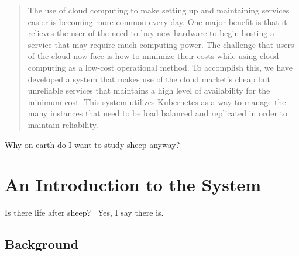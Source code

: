 \documentclass[thesis,proposal]{umassthesis}  %
\begin{document}
\begin{abstract}                %
  The use of cloud computing to make setting up and maintaining services easier
  is becoming more common every day. One major benefit is that it relieves the
  user of the need to buy new hardware to begin hosting a service that may require
  much computing power. The challenge that users of the cloud now face is how to
  minimize their costs while using cloud computing as a low-cost operational method.
  To accomplish this, we have developed a system that makes use of the cloud market's
  cheap but unreliable services that maintains a high level of availability for the
  minimum cost. This system utilizes Kubernetes as a way to manage the many instances
  that need to be load balanced and replicated in order to maintain reliability.
\end{abstract}



\tableofcontents                %
\listoftables                   %
\listoffigures                  %


\mainmatter   %

Why on earth do I want to study sheep anyway?

\chapter{An Introduction to the System}
Is there life after sheep?~\cite{xyz}  Yes, I say there is.%

\section{Background}
\end{document}
